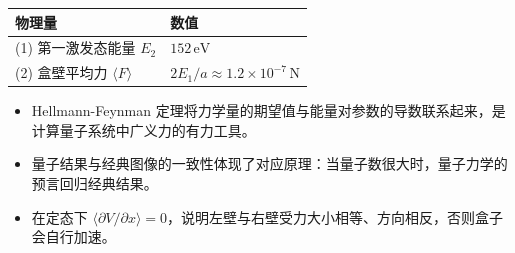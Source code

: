 \begin{formulabox}[答案汇总]
\begin{center}
\begin{tabular}{ll}
\toprule
\textbf{物理量} & \textbf{数值} \\
\midrule
(1) 第一激发态能量 $E_2$ & $152\,\text{eV}$ \\
(2) 盒壁平均力 $\langle F\rangle$ & $2E_1/a\approx1.2\times10^{-7}\,\text{N}$ \\
\bottomrule
\end{tabular}
\end{center}
\end{formulabox}

\begin{insightbox}[物理图像]
\begin{itemize}
    \item Hellmann-Feynman 定理将力学量的期望值与能量对参数的导数联系起来，是计算量子系统中广义力的有力工具。
    \item 量子结果与经典图像的一致性体现了对应原理：当量子数很大时，量子力学的预言回归经典结果。
    \item 在定态下 $\langle\partial V/\partial x\rangle=0$，说明左壁与右壁受力大小相等、方向相反，否则盒子会自行加速。
\end{itemize}
\end{insightbox}
